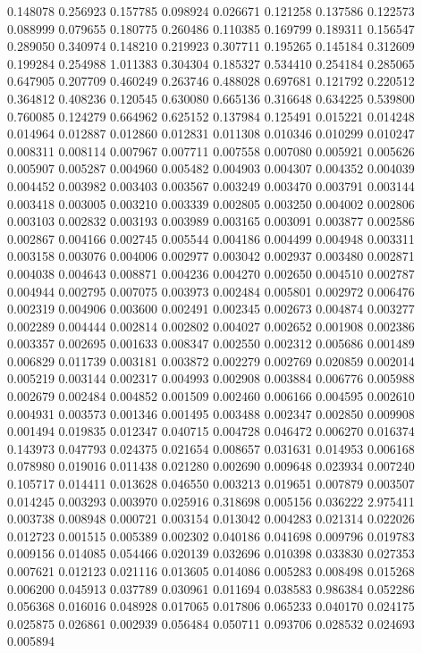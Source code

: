 0.148078
0.256923
0.157785
0.098924
0.026671
0.121258
0.137586
0.122573
0.088999
0.079655
0.180775
0.260486
0.110385
0.169799
0.189311
0.156547
0.289050
0.340974
0.148210
0.219923
0.307711
0.195265
0.145184
0.312609
0.199284
0.254988
1.011383
0.304304
0.185327
0.534410
0.254184
0.285065
0.647905
0.207709
0.460249
0.263746
0.488028
0.697681
0.121792
0.220512
0.364812
0.408236
0.120545
0.630080
0.665136
0.316648
0.634225
0.539800
0.760085
0.124279
0.664962
0.625152
0.137984
0.125491
0.015221
0.014248
0.014964
0.012887
0.012860
0.012831
0.011308
0.010346
0.010299
0.010247
0.008311
0.008114
0.007967
0.007711
0.007558
0.007080
0.005921
0.005626
0.005907
0.005287
0.004960
0.005482
0.004903
0.004307
0.004352
0.004039
0.004452
0.003982
0.003403
0.003567
0.003249
0.003470
0.003791
0.003144
0.003418
0.003005
0.003210
0.003339
0.002805
0.003250
0.004002
0.002806
0.003103
0.002832
0.003193
0.003989
0.003165
0.003091
0.003877
0.002586
0.002867
0.004166
0.002745
0.005544
0.004186
0.004499
0.004948
0.003311
0.003158
0.003076
0.004006
0.002977
0.003042
0.002937
0.003480
0.002871
0.004038
0.004643
0.008871
0.004236
0.004270
0.002650
0.004510
0.002787
0.004944
0.002795
0.007075
0.003973
0.002484
0.005801
0.002972
0.006476
0.002319
0.004906
0.003600
0.002491
0.002345
0.002673
0.004874
0.003277
0.002289
0.004444
0.002814
0.002802
0.004027
0.002652
0.001908
0.002386
0.003357
0.002695
0.001633
0.008347
0.002550
0.002312
0.005686
0.001489
0.006829
0.011739
0.003181
0.003872
0.002279
0.002769
0.020859
0.002014
0.005219
0.003144
0.002317
0.004993
0.002908
0.003884
0.006776
0.005988
0.002679
0.002484
0.004852
0.001509
0.002460
0.006166
0.004595
0.002610
0.004931
0.003573
0.001346
0.001495
0.003488
0.002347
0.002850
0.009908
0.001494
0.019835
0.012347
0.040715
0.004728
0.046472
0.006270
0.016374
0.143973
0.047793
0.024375
0.021654
0.008657
0.031631
0.014953
0.006168
0.078980
0.019016
0.011438
0.021280
0.002690
0.009648
0.023934
0.007240
0.105717
0.014411
0.013628
0.046550
0.003213
0.019651
0.007879
0.003507
0.014245
0.003293
0.003970
0.025916
0.318698
0.005156
0.036222
2.975411
0.003738
0.008948
0.000721
0.003154
0.013042
0.004283
0.021314
0.022026
0.012723
0.001515
0.005389
0.002302
0.040186
0.041698
0.009796
0.019783
0.009156
0.014085
0.054466
0.020139
0.032696
0.010398
0.033830
0.027353
0.007621
0.012123
0.021116
0.013605
0.014086
0.005283
0.008498
0.015268
0.006200
0.045913
0.037789
0.030961
0.011694
0.038583
0.986384
0.052286
0.056368
0.016016
0.048928
0.017065
0.017806
0.065233
0.040170
0.024175
0.025875
0.026861
0.002939
0.056484
0.050711
0.093706
0.028532
0.024693
0.005894
